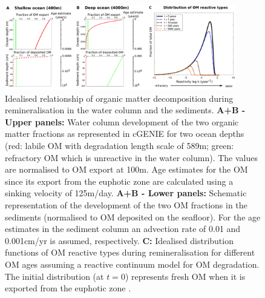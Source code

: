 \documentclass[gmd, manuscript]{copernicus}
\begin{document}
\begin{figure}[htbp]
\begin{center}
	\includegraphics[width=0.9\textwidth]{figures/OM_reactivity/OM_degradation_0808_updated.pdf}
	\caption{Idealised relationship of organic matter decomposition during remineralisation in the water column and the sediments. 
	\textbf{A+B - Upper panels:} Water column development of the two organic matter fractions as represented in cGENIE for two ocean depths 
	(red: labile OM with degradation length scale of 589m; green: refractory OM which is unreactive in the water column). The values are normalised to OM export at 100m. 
	Age estimates for the OM since its export from the euphotic zone are calculated using a sinking velocity of 125m/day. 
	\textbf{A+B - Lower panels:} Schematic representation of the development of the two OM fractions in the sediments (normalised to OM deposited on the seafloor). 
	For the age estimates in the sediment column an advection rate of 0.01 and 0.001cm/yr is assumed, respectively. 
	\textbf{C:} Idealised distribution functions of OM reactive types during remineralisation for different OM ages   
	assuming a reactive continuum model for OM degradation. The initial distribution (at $t=0$) represents fresh OM when it is exported from the euphotic zone 
	\citep[characterised by $a=3e^{-4}$ yr$^{-1}$ and $\nu=0.125$][]{boudreau_comment_2008}.
	}\label{fig:OM_reactivity}
\end{center}
\end{figure}
\end{document}
